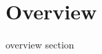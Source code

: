 \documentclass[../../../../dd.tex]{subfiles}
\begin{document}
	\section{Overview}

	overview section
\end{document}
